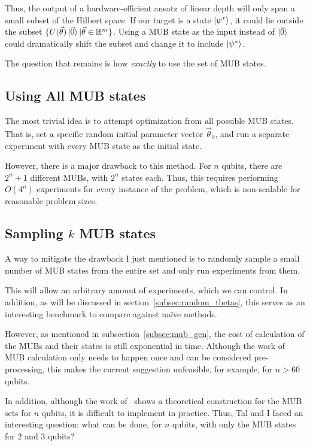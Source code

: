 \documentclass[a4paper,12pt]{article}
\newcommand{\thetas}{\vec{\theta}}
\begin{document}
Thus, the output of a hardware-efficient ansatz of linear depth will only span a small subset of the Hilbert space.
If our target is a state $\ket{\psi^*}$, it could lie outside the subset $\{U(\thetas)\ket{\vec{0}} | \thetas \in \mathbb{R}^m\}$. Using a MUB state as the input instead of $\ket{\vec{0}}$ could dramatically shift the subset and change it to include $\ket{\psi^*}$.

\medskip
The question that remains is how \emph{exactly} to use the set of MUB states.

\subsection{Using All MUB states}
The most trivial idea is to attempt optimization from all possible MUB states.
That is, set a specific random initial parameter vector $\thetas_0$, and run a separate experiment with every MUB state as the initial state.

However, there is a major drawback to this method.
For $n$ qubits, there are $2^n+1$ different MUBs, with $2^n$ states each.
Thus, this requires performing $O(4^n)$ experiments for every instance of the problem, which is non-scalable for reasonable problem sizes.

\subsection{Sampling $k$ MUB states}
A way to mitigate the drawback I just mentioned is to randomly sample a small number of MUB states from the entire set and only run experiments from them.

This will allow an arbitrary amount of experiments, which we can control.
In addition, as will be discussed in section~\ref{subsec:random_thetas}, this serves as an interesting benchmark to compare against na{\"i}ve methods.

However, as mentioned in subsection~\ref{subsec:mub_gen}, the cost of calculation of the MUBs and their states is still exponential in time. Although the work of MUB calculation only needs to happen once and can be considered pre-processing, this makes the current suggestion unfeasible, for example, for $n>60$ qubits.

In addition, although the work of~\cite{bandyopadhyay_new_2002} shows a theoretical construction for the MUB sets for $n$ qubits, it is difficult to implement in practice.
Thus, Tal and I faced an interesting question: what can be done, for $n$ qubits, with only the MUB states for 2 and 3 qubits?
\end{document}
